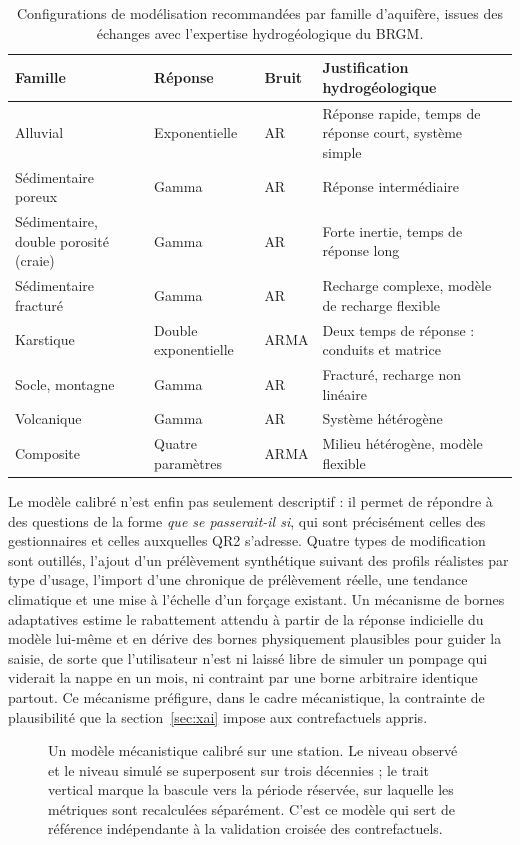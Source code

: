 \begin{table}[H]
\centering
\caption{Configurations de modélisation recommandées par famille d'aquifère, issues des échanges avec l'expertise hydrogéologique du BRGM.}
\label{tab:familles-aquiferes}
\begin{tabularx}{\textwidth}{@{}L{2.9cm}llY@{}}
\toprule
\textbf{Famille} & \textbf{Réponse} & \textbf{Bruit} & \textbf{Justification hydrogéologique} \\
\midrule
Alluvial & Exponentielle & AR & Réponse rapide, temps de réponse court, système simple \\
Sédimentaire poreux & Gamma & AR & Réponse intermédiaire \\
Sédimentaire, double porosité (craie) & Gamma & AR & Forte inertie, temps de réponse long \\
Sédimentaire fracturé & Gamma & AR & Recharge complexe, modèle de recharge flexible \\
Karstique & Double exponentielle & ARMA & Deux temps de réponse : conduits et matrice \\
Socle, montagne & Gamma & AR & Fracturé, recharge non linéaire \\
Volcanique & Gamma & AR & Système hétérogène \\
Composite & Quatre paramètres & ARMA & Milieu hétérogène, modèle flexible \\
\bottomrule
\end{tabularx}
\end{table}

Le modèle calibré n'est enfin pas seulement descriptif : il permet de répondre à des questions de la forme \emph{que se passerait-il si}, qui sont précisément celles des gestionnaires et celles auxquelles QR2 s'adresse. Quatre types de modification sont outillés, l'ajout d'un prélèvement synthétique suivant des profils réalistes par type d'usage, l'import d'une chronique de prélèvement réelle, une tendance climatique et une mise à l'échelle d'un forçage existant. Un mécanisme de bornes adaptatives estime le rabattement attendu à partir de la réponse indicielle du modèle lui-même et en dérive des bornes physiquement plausibles pour guider la saisie, de sorte que l'utilisateur n'est ni laissé libre de simuler un pompage qui viderait la nappe en un mois, ni contraint par une borne arbitraire identique partout. Ce mécanisme préfigure, dans le cadre mécanistique, la contrainte de plausibilité que la section~\ref{sec:xai} impose aux contrefactuels appris.

\begin{figure}[H]
\centering
{}
\caption{Un modèle mécanistique calibré sur une station. Le niveau observé et le niveau simulé se superposent sur trois décennies ; le trait vertical marque la bascule vers la période réservée, sur laquelle les métriques sont recalculées séparément. C'est ce modèle qui sert de référence indépendante à la validation croisée des contrefactuels. \lecas}
\label{fig:st32-metier}
\end{figure}



